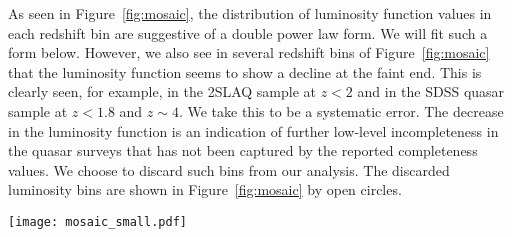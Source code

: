 \documentclass[fleqn,usenatbib]{mnras}
\begin{document}
    As seen in Figure~\ref{fig:mosaic}, the distribution of luminosity
    function values in each redshift bin are suggestive of a double
    power law form.  We will fit such a form below.  However, we also
    see in several redshift bins of Figure~\ref{fig:mosaic} that the
    luminosity function seems to show a decline at the faint end.  This
    is clearly seen, for example, in the 2SLAQ sample at $z<2$ and in
    the SDSS quasar sample at $z<1.8$ and $z\sim 4$.  We take this to be
    a systematic error.  The decrease in the luminosity function is an
    indication of further low-level incompleteness in the quasar surveys
    that has not been captured by the reported completeness values.  We
    choose to discard such bins from our analysis.  The discarded
    luminosity bins are shown in Figure~\ref{fig:mosaic} by open
    circles.

    \begin{figure*}
      \begin{center}
        \texttt{[image: mosaic\_small.pdf]}
      \end{center}
      \caption{Luminosity function estimates in redshift bins from $z=0.1$
        to $6.5$.  The symbols show our inferred binned luminosity
        functions from various data sets: sample ID 13 (red), 15 (green),
        1 (blue), 17 (yellow), 8 (brown), 6 (light blue), 18 (pink), 10
        (orange), and 11 (grey).  See Table~\ref{tab:samples} for
        references.  Open circles in corresponding colours indicate
        excluded incomplete bins for the respective data sets.  In each
        redshift bin, the black curve shows the best-fit double power law
        model, which is represented by the median of the posterior
        probability distribution function.  The grey shaded area shows the
        one-sigma (68.26\%) uncertainty.  Each panel shows the number of
        quasars in the respective redshift bin.  The numbers in
        parentheses indicate the total number of reported quasars in the
        respective redshift bin, before excluding incomplete bins.  See
        Sections~\ref{sec:binnedlf} and \ref{sec:bins} for further
        details.}
      \label{fig:mosaic}
    \end{figure*}
\end{document}
